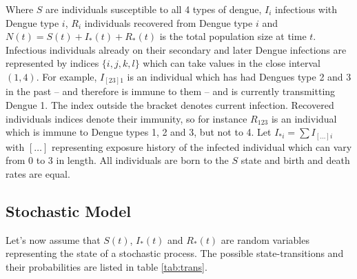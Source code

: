 \documentclass[12pt]{article}
\begin{document}
Where $S$ are individuals susceptible to all 4 types of dengue, $I_i$ 
infectious 
with Dengue type $i$, $R_i$ individuals recovered from Dengue type $i$ and 
$N(t) = S(t) + I_*(t) + R_*(t)$ is the total population size at time $t$. 
Infectious individuals already on their secondary and later Dengue infections 
are represented by indices $\{i,j,k,l\}$ which can take values in the close 
interval $(1,4)$. For example, $I_{[23]1}$ is an individual 
which has had Dengues type 2 and 3 in the past -- and therefore is immune to 
them -- and is currently transmitting Dengue 1. 
The index outside the bracket 
denotes current infection. Recovered individuals indices denote their immunity, 
so for instance $R_{123}$ is an individual which is immune to Dengue types 1, 2 
and 3, but not to 4. Let $I_{*i} = \sum I_{[\ldots]i}$ with $[\ldots]$ 
representing exposure history of the infected individual which can vary from 0 
to 3 in length. 
All individuals are born to the $S$ state and birth and death 
rates are equal.

\subsection*{Stochastic Model}
Let's now assume that $S(t)$, $I_*(t)$ and $R_*(t)$ are random variables 
representing the state of a stochastic process.
The possible state-transitions and their  probabilities are listed in table 
\ref{tab:trans}.
\end{document}
